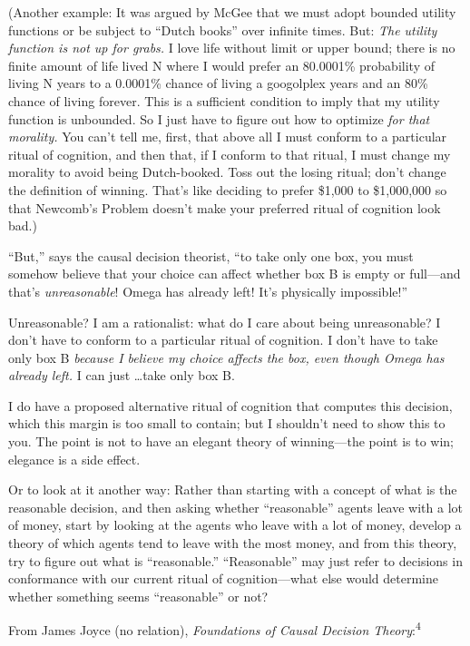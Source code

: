 {
 (Another example: It was argued by McGee that we must adopt
bounded utility functions or be subject to ``Dutch
books'' over infinite times. But: \textit{The utility
function is not up for grabs.} I love life without limit or upper
bound; there is no finite amount of life lived N where I would prefer
an 80.0001\% probability of living N years to a 0.0001\% chance of
living a googolplex years and an 80\% chance of living forever. This is
a sufficient condition to imply that my utility function is unbounded.
So I just have to figure out how to optimize \textit{for that
morality.} You can't tell me, first, that above all I
must conform to a particular ritual of cognition, and then that, if I
conform to that ritual, I must change my morality to avoid being
Dutch-booked. Toss out the losing ritual; don't change
the definition of winning. That's like deciding to
prefer \$1,000 to \$1,000,000 so that Newcomb's Problem
doesn't make your preferred ritual of cognition look
bad.)}

{
 ``But,'' says the causal
decision theorist, ``to take only one box, you must
somehow believe that your choice can affect whether box B is empty or
full---and that's \textit{unreasonable}! Omega has
already left! It's physically
impossible!''}

{
 Unreasonable? I am a rationalist: what do I care about being
unreasonable? I don't have to conform to a particular
ritual of cognition. I don't have to take only box B
\textit{because I believe my choice affects the box, even though Omega
has already left.} I can just \ldots take only box B.}

{
 I do have a proposed alternative ritual of cognition that computes
this decision, which this margin is too small to contain; but I
shouldn't need to show this to you. The point is not to
have an elegant theory of winning---the point is to win; elegance is a
side effect.}

{
 Or to look at it another way: Rather than starting with a concept
of what is the reasonable decision, and then asking whether
``reasonable'' agents leave with a
lot of money, start by looking at the agents who leave with a lot of
money, develop a theory of which agents tend to leave with the most
money, and from this theory, try to figure out what is
``reasonable.''
``Reasonable'' may just refer to
decisions in conformance with our current ritual of cognition---what
else would determine whether something seems
``reasonable'' or not?}

{
 From James Joyce (no relation), \textit{Foundations of Causal
Decision Theory}:\textsuperscript{4}}

